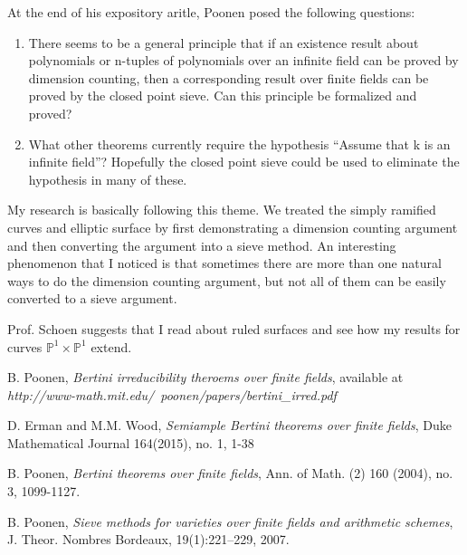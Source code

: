 \documentclass[12pt]{article}
\theoremstyle{plain}
\theoremstyle{definition}
\newcommand{\IP}{\mathbb{P}}
\newcommand{\<}{\langle}
\renewcommand{\>}{\rangle}
\begin{document}
At the end of his expository aritle, Poonen posed the following questions:
\begin{enumerate}
\item There seems to be a general principle that if an existence result about polynomials
or n-tuples of polynomials over an infinite field can be proved by dimension counting,
then a corresponding result over finite fields can be proved by the closed point sieve.
Can this principle be formalized and proved?

\item What other theorems currently require the hypothesis “Assume that k is an infinite
field”? Hopefully the closed point sieve could be used to eliminate the hypothesis in
many of these.
\end{enumerate}

My research is basically following this theme. We treated the simply ramified curves and elliptic surface by first demonstrating a dimension counting argument and then converting the argument into a sieve method. An interesting phenomenon that I noticed is that sometimes there are more than one natural ways to do the dimension counting argument, but not all of them can be easily converted to a sieve argument. 

Prof. Schoen suggests that I read about ruled surfaces and see how my results for curves $\IP^1 \times \IP^1$ extend. 

\begin{thebibliography}{9}
B. Poonen, \textit{Bertini irreducibility theroems over finite fields}, available at \textit{http://www-math.mit.edu/~poonen/papers/bertini\_irred.pdf}

D. Erman and M.M. Wood, \textit{Semiample Bertini theorems over finite fields}, Duke Mathematical Journal 164(2015), no. 1, 1-38

B. Poonen, \textit{Bertini theorems over finite fields}, Ann. of Math. (2) 160 (2004), no. 3, 1099-1127.

B. Poonen, \textit{Sieve methods for varieties over finite fields and arithmetic schemes}, J. Theor. Nombres Bordeaux, 19(1):221–229, 2007.


\end{thebibliography}
\end{document}
